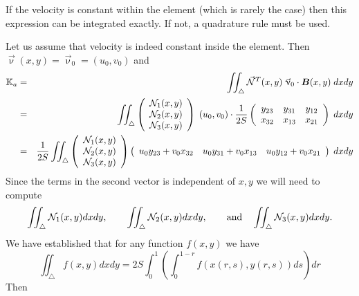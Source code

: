 If the velocity is constant within the element (which is rarely the case) then 
this expression can be integrated exactly. If not, a quadrature rule must be used.

Let us assume that velocity is indeed constant inside the element. Then
$\vec{\upnu}(x,y)=\vec\upnu_0=(u_0,v_0)$ and
\begin{eqnarray}
{\mathbb{K}}_a 
&=& \iint_\triangle \vec{{\mathcal{N}}}^T(x,y) \; \vec{\upnu}_0 \cdot {\bm B}(x,y) \; dx dy \nonumber\\
&=& \iint_\triangle
\left(
\begin{array}{c}
{\mathcal{N}}_1(x,y) \\
{\mathcal{N}}_2(x,y) \\
{\mathcal{N}}_3(x,y) 
\end{array}
\right)
\;
(u_0,v_0)
\cdot
\frac{1}{2S}
\left(
\begin{array}{ccc}
y_{23} & y_{31} & y_{12} \\
x_{32} & x_{13} & x_{21}
\end{array}
\right) \; dxdy \nonumber\\
&=& 
\frac{1}{2S}
\iint_\triangle
\left(
\begin{array}{c}
{\mathcal{N}}_1(x,y) \\
{\mathcal{N}}_2(x,y) \\
{\mathcal{N}}_3(x,y) 
\end{array}
\right)
\left(
\begin{array}{ccc}
u_0 y_{23}+ v_0 x_{32}  &
u_0 y_{31}+ v_0 x_{13}  &
u_0 y_{12}+ v_0 x_{21}  
\end{array}
\right)
\; dx dy \nonumber
\end{eqnarray}
Since the terms in the second vector is independent of $x,y$ we will need to compute
\[
\iint_\triangle {\mathcal{N}}_1(x,y) dxdy, \qquad 
\iint_\triangle {\mathcal{N}}_2(x,y) dxdy, \qquad \text{and} \quad 
\iint_\triangle {\mathcal{N}}_3(x,y) dxdy. 
\]
We have established that for any function $f(x,y)$ we have
\[
\iint_\triangle f(x,y) dx dy = 2S \int_0^{1} \left(\int_0^{1-r} f(x(r,s),y(r,s))  ds \right) dr 
\]
Then
